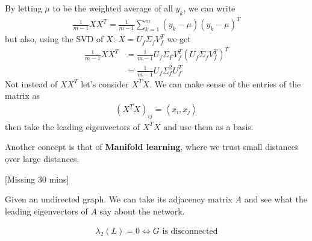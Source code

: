 By letting $\mu$ to be the weighted average of all $y_k$, we can write
\begin{align*}
  \frac{1}{m-1}XX^{T} = \frac{1}{m-1} \sum_{k=1}^{m}(y_k - \mu)(y_k - \mu)^{T}
\end{align*}
but also, using the SVD of $X$: $X = U_f \Sigma_f V_f^{T}$ we get
\begin{align*}
  \frac{1}{m-1}XX^{T} 
  &= \frac{1}{m-1}U_f \Sigma_FV_f^{T}\left(
    U_f \Sigma_f V_f^{T}
  \right)^T
  \\
  &= \frac{1}{m-1}U_f \Sigma_f^2 U_f^{T}
\end{align*}
Not instead of $XX^{T}$ let's consider $X^{T}X$. We can make sense of the entries of the matrix as
\begin{align*}
  (X^{T}X)_{ij} =\left<x_i,x_j\right>
\end{align*}
then take the leading eigenvectors of $X^{T}X$ and use them as a basis.

Another concept is that of \textbf{Manifold learning}, where we trust small distances over large distances.

[Missing 30 mins]

Given an undirected graph. We can take its adjacency matrix $A$ and see what the leading eigenvectors of $A$ say about the network.

\begin{align*}
  \lambda_2(L) = 0 \iff G \text{ is disconnected}
\end{align*}



